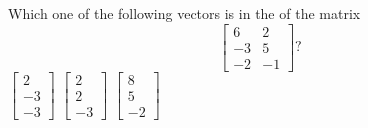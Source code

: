 \begin{activity}
Which one of the following vectors is in the  of the matrix
\begin{equation*}
\begin{bmatrix} 6 &  2
\\  -3 &  5
\\  -2 & -1 \end{bmatrix}?
\end{equation*}
{\(\begin{bmatrix} 2\\-3\\-3 \end{bmatrix}\)}
{\(\begin{bmatrix} 2\\2\\-3 \end{bmatrix}\)}
{\(\begin{bmatrix} 8\\5\\-2 \end{bmatrix}\)}
\end{activity}




